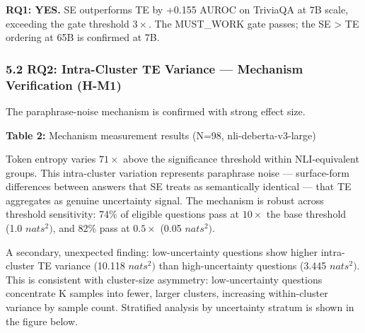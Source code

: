 \textbf{RQ1: YES.} SE outperforms TE by +0.155 AUROC on TriviaQA at 7B scale, exceeding the gate threshold $3\times$. The MUST\_WORK gate passes; the SE > TE ordering at 65B \citep{Kuhn2023Semantic} is confirmed at 7B.

\subsubsection{5.2 RQ2: Intra-Cluster TE Variance --- Mechanism Verification (H-M1)}

The paraphrase-noise mechanism is confirmed with strong effect size.

\textbf{Table 2:} Mechanism measurement results (N=98, nli-deberta-v3-large)

\begin{table}[htbp]
\centering
{}
\end{table}

Token entropy varies $71\times$ above the significance threshold within NLI-equivalent groups. This intra-cluster variation represents paraphrase noise --- surface-form differences between answers that SE treats as semantically identical --- that TE aggregates as genuine uncertainty signal. The mechanism is robust across threshold sensitivity: 74\% of eligible questions pass at $10\times$ the base threshold (1.0 $nats^{2})$, and 82\% pass at 0.$5\times$ (0.05 $nats^{2})$.

A secondary, unexpected finding: low-uncertainty questions show higher intra-cluster TE variance (10.118 $nats^{2})$ than high-uncertainty questions (3.445 $nats^{2})$. This is consistent with cluster-size asymmetry: low-uncertainty questions concentrate K samples into fewer, larger clusters, increasing within-cluster variance by sample count. Stratified analysis by uncertainty stratum is shown in the figure below.

